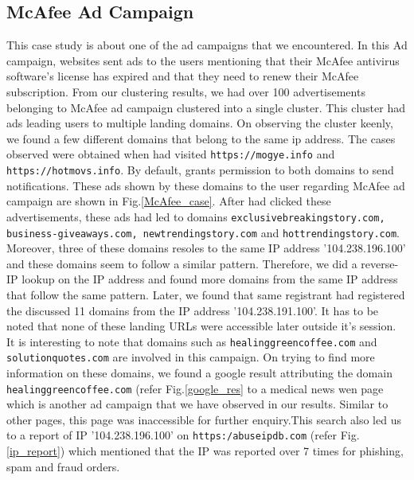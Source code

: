 \subsection{McAfee Ad Campaign}
This case study is about one of the ad campaigns that we encountered. In this Ad campaign, websites sent ads to the users mentioning that their McAfee antivirus software's license has expired and that they need to renew their McAfee subscription. From our clustering results, we had over 100 advertisements belonging to McAfee ad campaign clustered into a single cluster. This cluster had ads leading users to multiple landing domains. On observing the cluster keenly, we found a few different domains that belong to the same ip address. The cases observed were obtained when \sysname had visited \texttt{https://mogye.info} and \texttt{https://hotmovs.info}. By default, \sysname grants permission to both domains to send notifications. These ads shown by these domains to the user regarding McAfee ad campaign are shown in Fig.\ref{McAfee_case}. After \sysname had clicked these advertisements, these ads had led to domains \texttt{exclusivebreakingstory.com, business-giveaways.com, newtrendingstory.com} and \texttt{hottrendingstory.com}. Moreover, three of these domains resoles to the same IP address '104.238.196.100' and these domains seem to follow a similar pattern. Therefore, we did a reverse-IP lookup on the IP address and found more domains from the same IP address that follow the same pattern. Later, we found that same registrant had registered the discussed 11 domains from the IP address '104.238.191.100'. It has to be noted that none of these landing URLs were accessible later outside it's session. It is interesting to note that domains such as \texttt{healinggreencoffee.com} and \texttt{solutionquotes.com} are involved in this campaign. On trying to find more information on these domains, we found a google result attributing the domain \texttt{healinggreencoffee.com} (refer Fig.\ref{google_res} to a medical news wen page which is another ad campaign that we have observed in our results. Similar to other pages, this page was inaccessible for further enquiry.This search also led us to a report of IP '104.238.196.100' on \texttt{https:/abuseipdb.com} (refer Fig.\ref{ip_report}) which mentioned that the IP was reported over 7 times for phishing, spam and fraud orders. 

